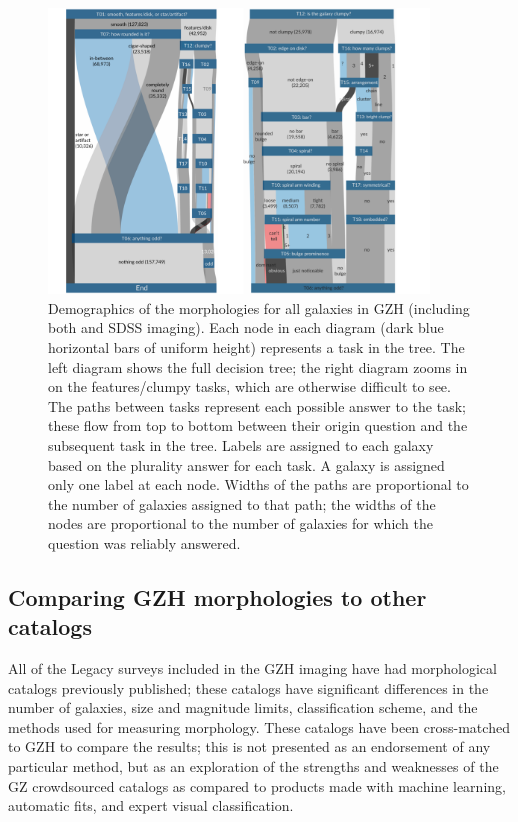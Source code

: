 \documentclass[twocolumn]{aastex6}
\begin{document}
\begin{figure}
\center
\includegraphics[width=0.90\textwidth]{figures/sankey_both.png}
\caption{Demographics of the morphologies for all galaxies in GZH (including both \hst{} and SDSS imaging). Each node in each diagram (dark blue horizontal bars of uniform height) represents a task in the tree. The left diagram shows the full decision tree; the right diagram zooms in on the features/clumpy tasks, which are otherwise difficult to see. The paths between tasks represent each possible answer to the task; these flow from top to bottom between their origin question and the subsequent task in the tree. Labels are assigned to each galaxy based on the plurality answer for each task. A galaxy is assigned only one label at each node. Widths of the paths are proportional to the number of galaxies assigned to that path; the widths of the nodes are proportional to the number of galaxies for which the question was reliably answered.}
\label{fig:sankey}
\end{figure}


\subsection{Comparing GZH morphologies to other catalogs}\label{ssec:comparisons}

All of the Legacy surveys included in the GZH imaging have had morphological catalogs previously published; these catalogs have significant differences in the number of galaxies, size and magnitude limits, classification scheme, and the methods used for measuring morphology. These catalogs have been cross-matched to GZH to compare the results; this is not presented as an endorsement of any particular method, but as an exploration of the strengths and weaknesses of the GZ crowdsourced catalogs as compared to products made with machine learning, automatic fits, and expert visual classification. 
\end{document}
